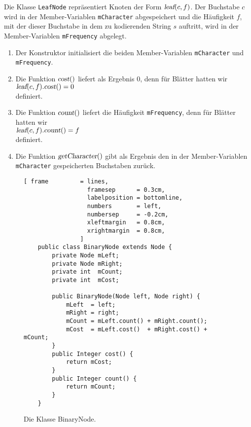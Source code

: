 Die Klasse \texttt{LeafNode} repr\"asentiert Knoten der Form $\textsl{leaf}(c,f)$.
Der Buchstabe $c$ wird in der Member-Variablen \texttt{mCharacter} abgespeichert und die H\"aufigkeit
$f$, mit der dieser Buchstabe in dem zu kodierenden String $s$ auftritt, wird in der
Member-Variablen \texttt{mFrequency} abgelegt.
\begin{enumerate}
\item Der Konstruktor initialisiert die beiden Member-Variablen \texttt{mCharacter} und
      \texttt{mFrequency}. 
\item Die Funktion $\textsl{cost}()$ liefert als Ergebnis $0$, denn f\"ur Bl\"atter hatten wir 
      \\[0.2cm]
      \hspace*{1.3cm}
      $\textsl{leaf}(c,f).\textsl{cost}() = 0$
      \\[0.2cm]
      definiert.
\item Die Funktion $\textsl{count}()$ liefert die H\"aufigkeit \texttt{mFrequency}, denn f\"ur Bl\"atter hatten wir
      \\[0.2cm]
      \hspace*{1.3cm}
      $\textsl{leaf}(c,f).\textsl{count}() = f$
      \\[0.2cm]
      definiert.
\item Die Funktion $\textsl{getCharacter}()$ gibt als Ergebnis den in der Member-Variablen \texttt{mCharacter}
      gespeicherten Buchstaben zur\"uck.
\end{enumerate}

\begin{figure}[!ht]
\centering
\begin{Verbatim}[ frame         = lines, 
                  framesep      = 0.3cm, 
                  labelposition = bottomline,
                  numbers       = left,
                  numbersep     = -0.2cm,
                  xleftmargin   = 0.8cm,
                  xrightmargin  = 0.8cm,
                ]
    public class BinaryNode extends Node {
        private Node mLeft;
        private Node mRight;
        private int  mCount;
        private int  mCost;
    
        public BinaryNode(Node left, Node right) {
            mLeft  = left;
            mRight = right;
            mCount = mLeft.count() + mRight.count();
            mCost  = mLeft.cost()  + mRight.cost() + mCount;
        }
        public Integer cost() {
            return mCost;
        }
        public Integer count() {
            return mCount;
        }
    }
\end{Verbatim}
\vspace*{-0.3cm}
\caption{Die Klasse BinaryNode.}
\label{fig:Huffman/BinaryNode.java}
\end{figure}

